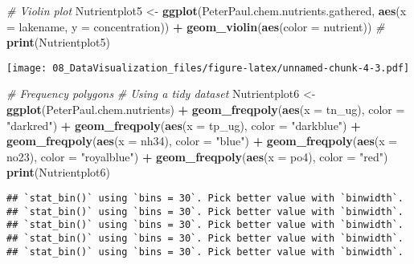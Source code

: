 \documentclass[
]{article}
\newenvironment{Shaded}{\begin{snugshade}}{\end{snugshade}}
\newcommand{\CommentTok}[1]{\textcolor[rgb]{0.56,0.35,0.01}{\textit{#1}}}
\newcommand{\DataTypeTok}[1]{\textcolor[rgb]{0.13,0.29,0.53}{#1}}
\newcommand{\KeywordTok}[1]{\textcolor[rgb]{0.13,0.29,0.53}{\textbf{#1}}}
\newcommand{\NormalTok}[1]{#1}
\newcommand{\OperatorTok}[1]{\textcolor[rgb]{0.81,0.36,0.00}{\textbf{#1}}}
\newcommand{\StringTok}[1]{\textcolor[rgb]{0.31,0.60,0.02}{#1}}
\begin{document}
\begin{Shaded}
\begin{Highlighting}[]
\CommentTok{# Violin plot}
\NormalTok{Nutrientplot5 <-}
\StringTok{  }\KeywordTok{ggplot}\NormalTok{(PeterPaul.chem.nutrients.gathered, }\KeywordTok{aes}\NormalTok{(}\DataTypeTok{x =}\NormalTok{ lakename, }\DataTypeTok{y =}\NormalTok{ concentration)) }\OperatorTok{+}
\StringTok{  }\KeywordTok{geom_violin}\NormalTok{(}\KeywordTok{aes}\NormalTok{(}\DataTypeTok{color =}\NormalTok{ nutrient)) }\CommentTok{#}
\KeywordTok{print}\NormalTok{(Nutrientplot5)}
\end{Highlighting}
\end{Shaded}

\texttt{[image: 08\_DataVisualization\_files/figure-latex/unnamed-chunk-4-3.pdf]}

\begin{Shaded}
\begin{Highlighting}[]
\CommentTok{# Frequency polygons}
\CommentTok{# Using a tidy dataset}
\NormalTok{Nutrientplot6 <-}
\StringTok{  }\KeywordTok{ggplot}\NormalTok{(PeterPaul.chem.nutrients) }\OperatorTok{+}
\StringTok{  }\KeywordTok{geom_freqpoly}\NormalTok{(}\KeywordTok{aes}\NormalTok{(}\DataTypeTok{x =}\NormalTok{ tn_ug), }\DataTypeTok{color =} \StringTok{"darkred"}\NormalTok{) }\OperatorTok{+}
\StringTok{  }\KeywordTok{geom_freqpoly}\NormalTok{(}\KeywordTok{aes}\NormalTok{(}\DataTypeTok{x =}\NormalTok{ tp_ug), }\DataTypeTok{color =} \StringTok{"darkblue"}\NormalTok{) }\OperatorTok{+}
\StringTok{  }\KeywordTok{geom_freqpoly}\NormalTok{(}\KeywordTok{aes}\NormalTok{(}\DataTypeTok{x =}\NormalTok{ nh34), }\DataTypeTok{color =} \StringTok{"blue"}\NormalTok{) }\OperatorTok{+}
\StringTok{  }\KeywordTok{geom_freqpoly}\NormalTok{(}\KeywordTok{aes}\NormalTok{(}\DataTypeTok{x =}\NormalTok{ no23), }\DataTypeTok{color =} \StringTok{"royalblue"}\NormalTok{) }\OperatorTok{+}
\StringTok{  }\KeywordTok{geom_freqpoly}\NormalTok{(}\KeywordTok{aes}\NormalTok{(}\DataTypeTok{x =}\NormalTok{ po4), }\DataTypeTok{color =} \StringTok{"red"}\NormalTok{) }
\KeywordTok{print}\NormalTok{(Nutrientplot6)}
\end{Highlighting}
\end{Shaded}

\begin{verbatim}
## `stat_bin()` using `bins = 30`. Pick better value with `binwidth`.
## `stat_bin()` using `bins = 30`. Pick better value with `binwidth`.
## `stat_bin()` using `bins = 30`. Pick better value with `binwidth`.
## `stat_bin()` using `bins = 30`. Pick better value with `binwidth`.
## `stat_bin()` using `bins = 30`. Pick better value with `binwidth`.
\end{verbatim}
\end{document}
